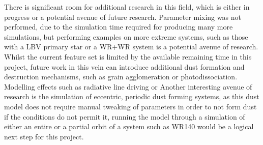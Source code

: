 There is significant room for additional research in this field, which is either in progress or a potential avenue of future research.
Parameter mixing was not performed, due to the simulation time required for producing many more simulations, but performing examples on more extreme systems, such as those with a LBV primary star or a WR+WR system is a potential avenue of research.
Whilst the current feature set is limited by the available remaining time in this project, future work in this vein can introduce additional dust formation and destruction mechanisms, such as grain agglomeration or photodissociation.
Modelling effects such as radiative line driving or 
Another interesting avenue of research is the simulation of eccentric, periodic dust forming systems, as this dust model does not require manual tweaking of parameters in order to not form dust if the conditions do not permit it, running the model through a simulation of either an entire or a partial orbit of a system such as WR140 would be a logical next step for this project.